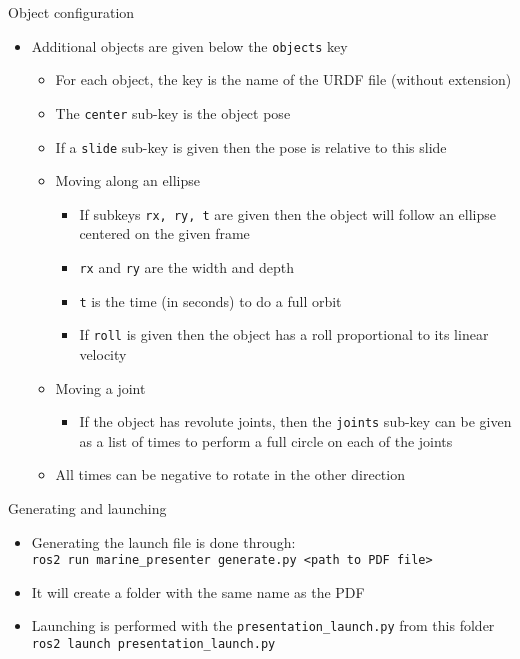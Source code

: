 \documentclass{ecnbeamer}
\begin{document}
\begin{frame}{Object configuration}
\begin{itemize}
 \item Additional objects are given below the \texttt{objects} key
 \begin{itemize}
  \item For each object, the key is the name of the URDF file (without extension)
  \item The \texttt{center} sub-key is the object pose
  \item If a \texttt{slide} sub-key is given then the pose is relative to this slide\vfill
  \item Moving along an ellipse
  \begin{itemize}
   \item If subkeys \texttt{rx, ry, t} are given then the object will follow an ellipse centered on the given frame
   \item \texttt{rx} and \texttt{ry} are the width and depth 
   \item \texttt{t} is the time (in seconds) to do a full orbit
   \item If \texttt{roll} is given then the object has a roll proportional to its linear velocity
  \end{itemize}\vfill
  \item Moving a joint
  \begin{itemize}
   \item If the object has revolute joints, then the \texttt{joints} sub-key can be given as a list of times to perform a full circle on each of the joints 
  \end{itemize}\vfill
  \item All times can be negative to rotate in the other direction
 \end{itemize}
\end{itemize}
\end{frame}

\begin{frame}{Generating and launching}
 \begin{itemize}
  \item Generating the launch file is done through:\\
  \texttt{ros2 run marine\_presenter generate.py <path to PDF file>}\vfill
  \item It will create a folder with the same name as the PDF\vfill
  \item Launching is performed with the \texttt{presentation\_launch.py} from this folder\\
  \texttt{ros2 launch presentation\_launch.py}
  
 \end{itemize}

\end{frame}
\end{document}
